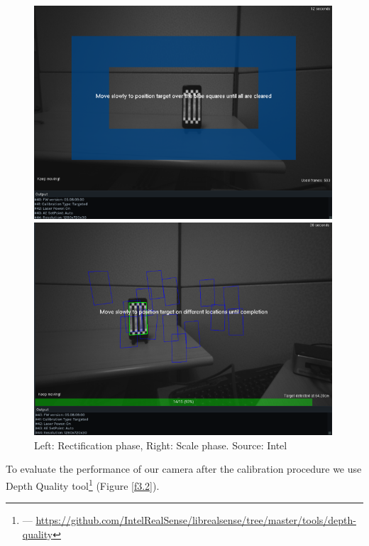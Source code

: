 \begin{figure}
  \begin{minipage}{.49\textwidth}
    \includegraphics[width=0.99\textwidth]{Figures/Pictures/cal1.png}
  \end{minipage}
  \begin{minipage}{.49\textwidth}
    \includegraphics[width=0.99\textwidth]{Figures/Pictures/cal2.png}
  \end{minipage}
  \caption{Left: Rectification phase, Right: Scale phase. Source: Intel}
  \label{f3.1}
\end{figure} 

To evaluate the performance of our camera after the calibration procedure we use Depth Quality tool\footnote{ — \url{https://github.com/IntelRealSense/librealsense/tree/master/tools/depth-quality}} (Figure \ref{f3.2}). 

